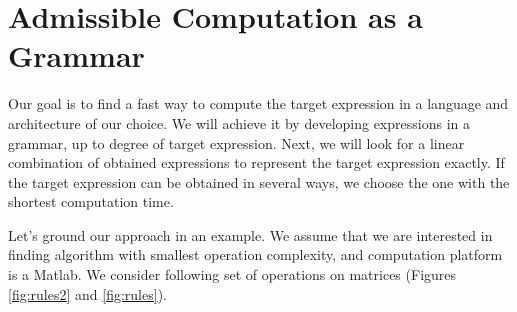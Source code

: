 \section{Admissible Computation as a Grammar}\label{sec:grammars}

Our goal is to find a fast way to compute the target expression in
a language and architecture of our choice. We will achieve it by
developing expressions in a grammar, up to degree of target
expression. Next, we will look for a linear combination of obtained
expressions to represent the target expression exactly. If the target expression
can be obtained in several ways, we choose the one with the shortest computation time.

Let's ground our approach in an example. We assume that we are interested in
finding algorithm with smallest operation complexity, and computation platform
is a Matlab. We consider following set of operations on matrices (Figures \ref{fig:rules2} and \ref{fig:rules}).


